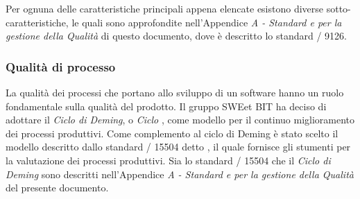     Per ognuna delle caratteristiche principali appena elencate esistono diverse sotto-caratteristiche,
    le quali sono approfondite nell'Appendice \emph{A - Standard e  per la gestione della Qualità} di questo documento, dove è descritto lo standard / 9126.

    \subsubsection{Qualità di processo}
    La qualità dei processi che portano allo sviluppo di un software hanno un ruolo fondamentale sulla qualità del prodotto.
    Il gruppo SWEet BIT ha deciso di adottare il \emph{Ciclo di Deming}, o \emph{Ciclo} , come modello per il continuo miglioramento dei processi produttivi.
    Come complemento al ciclo di Deming è stato scelto il modello descritto dallo standard / 15504 detto ,
    il quale fornisce gli stumenti per la valutazione dei processi produttivi.
    Sia lo standard / 15504 che il \emph{Ciclo di Deming} sono descritti nell'Appendice \emph{A - Standard e  per la gestione della Qualità} del presente documento.

